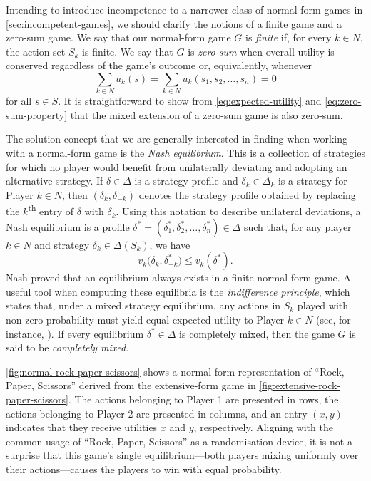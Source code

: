     Intending to introduce incompetence to a narrower class of normal-form games in \autoref{sec:incompetent-games}, we should clarify the notions of a finite game and a zero-sum game.
    We say that our normal-form game $G$ is \emph{finite} if, for every $k \in N$, the action set $S_k$ is finite.
    We say that $G$ is \emph{zero-sum} when overall utility is conserved regardless of the game's outcome or, equivalently, whenever
    \begin{equation} \label{eq:zero-sum-property}
        \sum_{k \in N} u_k(s)
            = \sum_{k \in N} u_k(s_1, s_2, \ldots, s_n)
            = 0
    \end{equation}
    for all $s \in S$.
    It is straightforward to show from \eqref{eq:expected-utility} and \eqref{eq:zero-sum-property} that the mixed extension of a zero-sum game is also zero-sum.

    The solution concept that we are generally interested in finding when working with a normal-form game is the \emph{Nash equilibrium}.
    This is a collection of strategies for which no player would benefit from unilaterally deviating and adopting an alternative strategy.
    If $\delta \in \Delta$ is a strategy profile and $\delta_k \in \Delta_k$ is a strategy for Player $k \in N$, then $(\delta_k, \delta_{-k})$ denotes the strategy profile obtained by replacing the $k$\textsuperscript{th} entry of $\delta$ with $\delta_k$.
    Using this notation to describe unilateral deviations, a Nash equilibrium is a profile $\delta^* = (\delta^*_1, \delta^*_2, \ldots, \delta^*_n) \in \Delta$ such that, for any player $k \in N$ and strategy $\delta_k \in \Delta(S_k)$, we have
    \begin{equation} \label{eq:nash-equilibrium}
        v_k\bigl(\delta_k, \delta^*_{-k}\bigr)
            \le v_k(\delta^*).
    \end{equation}
    Nash \parencite{Nash1950} proved that an equilibrium always exists in a finite normal-form game.
    A useful tool when computing these equilibria is the \emph{indifference principle}, which states that, under a mixed strategy equilibrium, any actions in $S_k$ played with non-zero probability must yield equal expected utility to Player $k \in N$ (see, for instance, \parencite[Theorem 5.18]{Maschler2013}).
    If every equilibrium $\delta^* \in \Delta$ is completely mixed, then the game $G$ is said to be \emph{completely mixed}.

    \autoref{fig:normal-rock-paper-scissors} shows a normal-form representation of ``Rock, Paper, Scissors'' derived from the extensive-form game in \autoref{fig:extensive-rock-paper-scissors}.
    The actions belonging to Player 1 are presented in rows, the actions belonging to Player 2 are presented in columns, and an entry $(x, y)$ indicates that they receive utilities $x$ and $y$, respectively.
    Aligning with the common usage of ``Rock, Paper, Scissors'' as a randomisation device, it is not a surprise that this game's single equilibrium---both players mixing uniformly over their actions---causes the players to win with equal probability.

